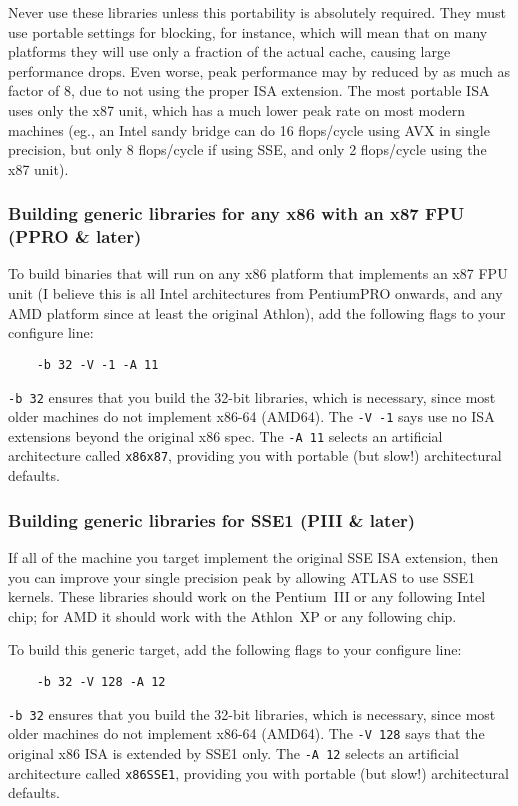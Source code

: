 \documentclass[11pt]{article}
\begin{document}
Never use these libraries unless this portability is absolutely required.
They must use portable settings for blocking, for instance, which will mean
that on many platforms they will use only a fraction of the actual cache,
causing large performance drops.  Even worse, peak performance may by reduced
by as much as factor of 8, due to not using the proper ISA extension.
The most portable ISA uses only the x87 unit, which has a much lower peak
rate on most modern machines (eg., an Intel sandy bridge can do 16 flops/cycle
using AVX in single precision, but only 8 flops/cycle if using SSE, and only
2 flops/cycle using the x87 unit).

\subsubsection{Building generic libraries for any x86 with an x87 FPU (PPRO \& later)}
To build binaries that will run on any x86 platform that implements an
x87 FPU unit (I believe this is all Intel architectures from PentiumPRO
onwards, and any AMD platform since at least the original Athlon), add
the following flags to your configure line:
\begin{verbatim}
    -b 32 -V -1 -A 11
\end{verbatim}

\verb+-b 32+ ensures that you build the 32-bit libraries, which is necessary,
since most older machines do not implement x86-64 (AMD64).  The 
\verb+-V -1+ says use no ISA extensions beyond the original x86 spec.
The \verb+-A 11+ selects an artificial architecture called \verb+x86x87+,
providing you with portable (but slow!) architectural defaults.

\subsubsection{Building generic libraries for SSE1 (PIII \& later)}
If all of the machine you target implement the original SSE ISA extension,
then you can improve your single precision peak by allowing ATLAS to use
SSE1 kernels.  These libraries should work on the Pentium~III or any following
Intel chip; for AMD it should work with the Athlon~XP or any following chip.

To build this generic target, add the following flags to your configure line:
\begin{verbatim}
    -b 32 -V 128 -A 12
\end{verbatim}

\verb+-b 32+ ensures that you build the 32-bit libraries, which is necessary,
since most older machines do not implement x86-64 (AMD64).  The 
\verb+-V 128+ says that the original x86 ISA is extended by SSE1 only.
The \verb+-A 12+ selects an artificial architecture called \verb+x86SSE1+,
providing you with portable (but slow!) architectural defaults.
\end{document}
